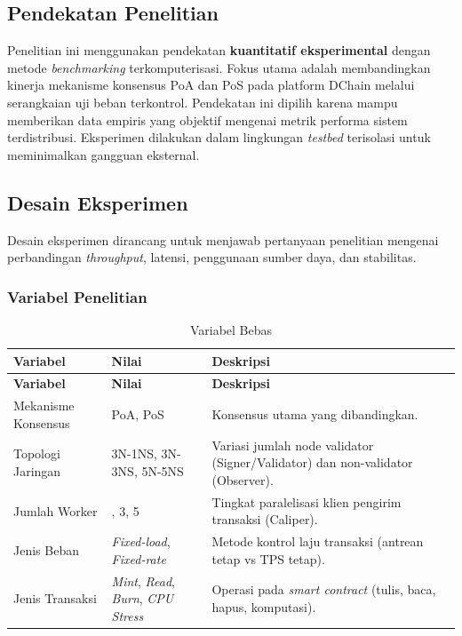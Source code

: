 \subsection{Pendekatan Penelitian}
Penelitian ini menggunakan pendekatan \textbf{kuantitatif eksperimental} dengan metode \textit{benchmarking} terkomputerisasi. Fokus utama adalah membandingkan kinerja mekanisme konsensus PoA dan PoS pada platform DChain melalui serangkaian uji beban terkontrol. Pendekatan ini dipilih karena mampu memberikan data empiris yang objektif mengenai metrik performa sistem terdistribusi. Eksperimen dilakukan dalam lingkungan \textit{testbed} terisolasi untuk meminimalkan gangguan eksternal.

\subsection{Desain Eksperimen}

Desain eksperimen dirancang untuk menjawab pertanyaan penelitian mengenai perbandingan \textit{throughput}, latensi, penggunaan sumber daya, dan stabilitas.

\clearpage
\subsubsection{Variabel Penelitian}

\begin{longtable}{|>{\raggedright\arraybackslash}p{4cm}|>{\raggedright\arraybackslash}p{3cm}|>{\raggedright\arraybackslash}p{8cm}|}
\caption{Variabel Bebas} \label{tab:variabel_bebas} \\
\hline
\textbf{Variabel} & \textbf{Nilai} & \textbf{Deskripsi} \\
\hline
\endfirsthead
\hline
\textbf{Variabel} & \textbf{Nilai} & \textbf{Deskripsi} \\
\hline
\endhead
\hline
\endlastfoot

Mekanisme Konsensus & PoA, PoS & Konsensus utama yang dibandingkan. \\
\hline
Topologi Jaringan & 3N-1NS, 3N-3NS, 5N-5NS & Variasi jumlah node validator (Signer/Validator) dan non-validator (Observer). \\
\hline
Jumlah Worker & 1, 3, 5 & Tingkat paralelisasi klien pengirim transaksi (Caliper). \\
\hline
Jenis Beban & \textit{Fixed-load}, \textit{Fixed-rate} & Metode kontrol laju transaksi (antrean tetap vs TPS tetap). \\
\hline
Jenis Transaksi & \textit{Mint}, \textit{Read}, \textit{Burn}, \textit{CPU Stress} & Operasi pada \textit{smart contract} (tulis, baca, hapus, komputasi). \\
\hline
\end{longtable}

